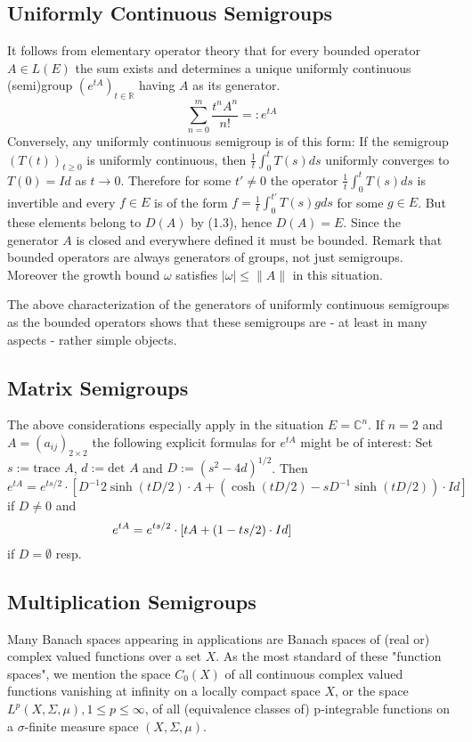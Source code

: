 \subsection{Uniformly Continuous Semigroups}
It follows from elementary operator theory that for every bounded operator $A \in L(E)$ the sum exists and determines a unique uniformly continuous (semi)group $(e^{tA})_{t \in \mathbb{R}}$ having $A$ as its generator.
\[
\sum_{n=0}^{m} \frac{t^n A^n}{n!} = \colon e^{tA}
\]
Conversely, any uniformly continuous semigroup is of this form: If the semigroup $(T(t))_{t \geq 0}$ is uniformly continuous, then $\frac{1}{t} \int_{0}^{t} T(s) ds$ uniformly converges to $T(0)=Id$ as $t \rightarrow 0$.
Therefore for some $t' \neq 0$ the operator $\frac{1}{t} \int_{0}^{t} T(s) ds$ is invertible and every $f \in E$ is of the form $f=\frac{1}{t} \int_{0}^{t'} T(s) g ds$ for some $g \in E$.
But these elements belong to $D(A)$ by (1.3), hence $D(A)=E$.
Since the generator $A$ is closed and everywhere defined it must be bounded.
Remark that bounded operators are always generators of groups, not just semigroups.
Moreover the growth bound $\omega$ satisfies $|\omega| \leq \|A\|$ in this situation.

The above characterization of the generators of uniformly continuous semigroups as the bounded operators shows that these semigroups are - at least in many aspects - rather simple objects.
\subsection{Matrix Semigroups}
The above considerations especially apply in the situation $E=\mathbb{C}^n$.
If $n=2$ and $A=(a_{ij})_{2\times 2}$ the following explicit formulas for $e^{tA}$ might be of interest:
Set $s:=\text{trace }A$, $d:=\text{det }A$ and $D:=(s^2-4d)^{1/2}$.
Then
\[
e^{tA}  = 
e^{ts/2} \cdot [D^{-1} 2\sinh(tD/2) \cdot A + (\cosh(tD/2)-sD^{-1}\sinh(tD/2)) \cdot Id]
\]
if $D \neq 0$ and
\[
e^{tA}  = 
e^{ts/2} \cdot [tA+(1-ts/2) \cdot Id] \text{\phantom{xxxxxxxxx}}
\]
if $D=\emptyset$ resp.
\subsection{Multiplication Semigroups}
Many Banach spaces appearing in applications are Banach spaces of (real or) complex valued functions over a set $X$.
As the most standard of these "function spaces", we mention the space $C_0(X)$ of all continuous complex valued functions vanishing at infinity on a locally compact space $X$, or the space $L^p(X,\Sigma,\mu), 1 \leq p \leq \infty$, of all (equivalence classes of) p-integrable functions on a $\sigma$-finite measure space $(X,\Sigma,\mu)$.

